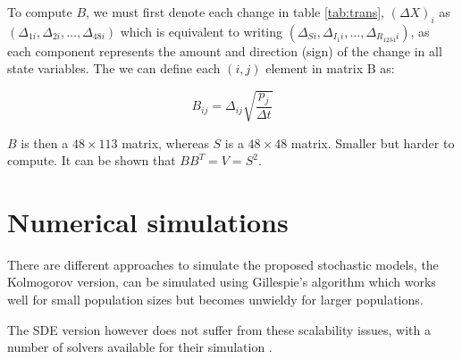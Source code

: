 \documentclass[12pt]{article}
\begin{document}
To compute $B$, we must first denote each change in table \ref{tab:trans}, 
$(\Delta X)_i$ as $(\Delta_{1i}, \Delta_{2i}, \ldots, \Delta_{48i})$ which is 
equivalent to writing $(\Delta_{Si}, \Delta_{I_1i}, \ldots, 
\Delta_{R_{1234}i})$, as each component represents the amount and direction 
(sign)  of the change in all state variables. The we can define each $(i,j)$ 
element in matrix B as:

\begin{equation}
 B_{ij} = \Delta_{ij}\sqrt{\frac{p_j}{\Delta t}}
\end{equation}

$B$ is then a $48 \times 113$ matrix, whereas $S$ is a $48 \times 48$ matrix. 
Smaller but harder to compute. It can be shown that $B B^T = V = S^2$.




\section*{Numerical simulations}

There are different approaches to simulate the proposed stochastic  models, the 
Kolmogorov version, can be simulated using Gillespie's algorithm which works 
well for small population sizes but becomes unwieldy for larger populations. 

The SDE version however does not suffer from these scalability issues, with a 
number of solvers available for their simulation 
\citep{higham_algorithmic_2001}.


\end{document}

